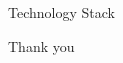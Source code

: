 \documentclass{beamer}
\begin{document}
\begin{frame}{Technology Stack}
\end{frame}

\begin{frame}{Thank you}
\end{frame}
\end{document}
